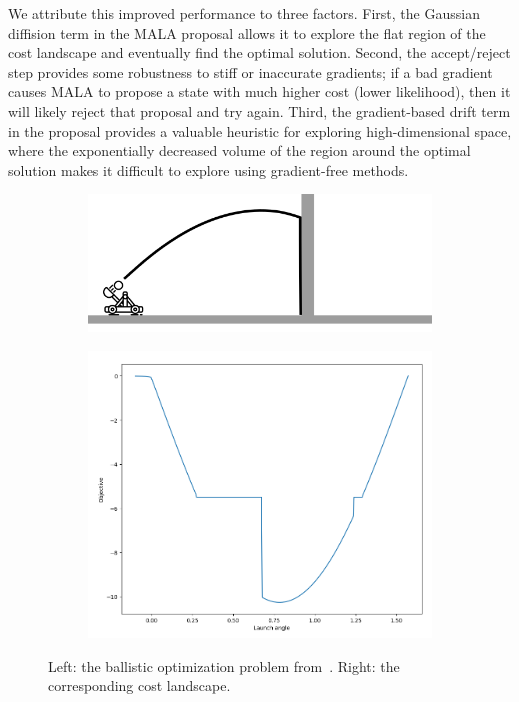 We attribute this improved performance to three factors. First, the Gaussian diffision term in the MALA proposal allows it to explore the flat region of the cost landscape and eventually find the optimal solution. Second, the accept/reject step provides some robustness to stiff or inaccurate gradients; if a bad gradient causes MALA to propose a state with much higher cost (lower likelihood), then it will likely reject that proposal and try again. Third, the gradient-based drift term in the proposal provides a valuable heuristic for exploring high-dimensional space, where the exponentially decreased volume of the region around the optimal solution makes it difficult to explore using gradient-free methods.

\begin{figure}[t]
    \centering
    \begin{subfigure}[t]{0.6\linewidth}
        \centering
        \includegraphics[width=\linewidth]{images/ch6/ballistic.png}
    \end{subfigure}
    \begin{subfigure}[t]{0.3\linewidth}
        \centering
        \includegraphics[width=\linewidth]{images/ch6/ballistic_cost.png}
    \end{subfigure}%
    \caption{Left: the ballistic optimization problem from~\cite{suhDifferentiableSimulatorsGive2022a}. Right: the corresponding cost landscape.}
    \label{ch6:fig:ballistic}
\end{figure}

